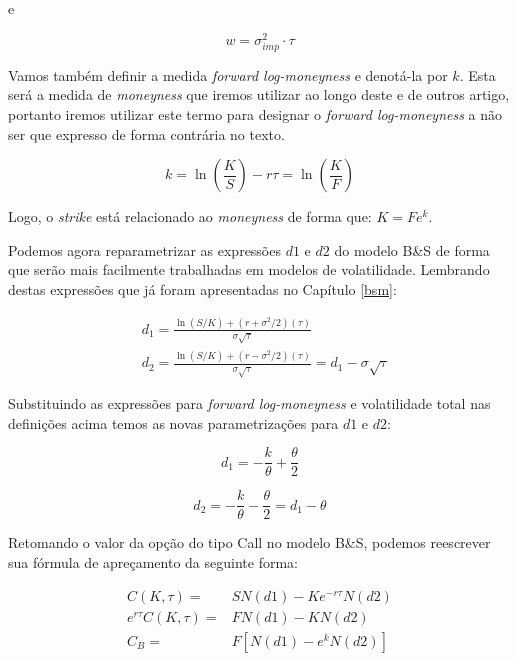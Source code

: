 \documentclass[]{book}
\begin{document}
e

\begin{equation}
w=\sigma_{imp}^2\cdot\tau
\label{eq:vartotal}
\end{equation}

Vamos também definir a medida \emph{forward log-moneyness} e denotá-la
por \(k\). Esta será a medida de \emph{moneyness} que iremos utilizar ao
longo deste e de outros artigo, portanto iremos utilizar este termo para
designar o \emph{forward log-moneyness} a não ser que expresso de forma
contrária no texto.

\begin{equation}
k=\ln\left(\frac{K}{S}\right)-r\tau=\ln\left(\frac{K}{F}\right)
\label{eq:flmoneyness}
\end{equation}

Logo, o \emph{strike} está relacionado ao \emph{moneyness} de forma que:
\(K=Fe^k\).

Podemos agora reparametrizar as expressões \(d1\) e \(d2\) do modelo
B\&S de forma que serão mais facilmente trabalhadas em modelos de
volatilidade. Lembrando destas expressões que já foram apresentadas no
Capítulo \ref{bsm}:

\begin{align}
&d_{1}={\frac {\ln(S/K)+(r+\sigma ^{2}/2)(\tau)}{\sigma {\sqrt {\tau}}}}\\
&d_{2}={\frac {\ln(S/K)+(r-\sigma ^{2}/2)(\tau)}{\sigma {\sqrt {\tau}}}}=d_1-\sigma\sqrt{\tau}
\end{align}

Substituindo as expressões para \emph{forward log-moneyness} e
volatilidade total nas definições acima temos as novas parametrizações
para \(d1\) e \(d2\):

\begin{equation}
d_{1}={-\frac{k}{\theta}+\frac{\theta}{2}}
\label{eq:d1mod}
\end{equation}

\begin{equation}
d_{2}={-\frac{k}{\theta}-\frac{\theta}{2}}=d_1-\theta
\label{eq:d2mod}
\end{equation}

Retomando o valor da opção do tipo Call no modelo B\&S, podemos
reescrever sua fórmula de apreçamento da seguinte forma:

\begin{equation}
\begin{aligned}
C(K, \tau)=&SN(d1)-Ke^{-r\tau}N(d2)\\
e^{r\tau}C(K, \tau)=&FN(d1)-KN(d2)\\
C_B=&F\left[N(d1)-e^kN(d2)\right]
\end{aligned}
\label{eq:cblack}
\end{equation}
\end{document}
